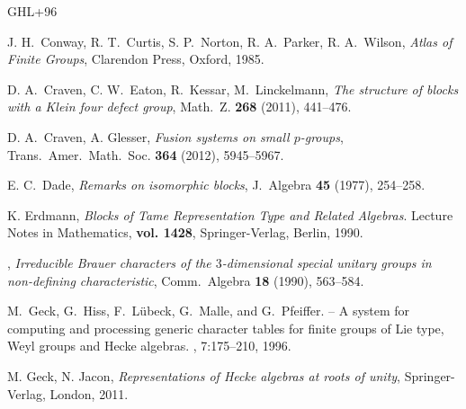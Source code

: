 \documentclass[12pt,a4paper]{amsart}
\theoremstyle{plain}\newtheorem{Theorem}{Theorem}[section]
\theoremstyle{plain}\newtheorem{Conjecture}[Theorem]{Conjecture}
\theoremstyle{plain}\newtheorem{Corollary}[Theorem]{Corollary}
\theoremstyle{plain}\newtheorem{Lemma}[Theorem]{Lemma}
\theoremstyle{plain}\newtheorem{Proposition}[Theorem]{Proposition}
\theoremstyle{definition}\newtheorem{Definition}[Theorem]{Definition}
\theoremstyle{definition}\newtheorem{Example}[Theorem]{Example}
\theoremstyle{definition}\newtheorem{Examples}[Theorem]{Examples}
\theoremstyle{definition}\newtheorem{Remark}[Theorem]{Remark}
\theoremstyle{definition}\newtheorem{Question}[Theorem]{Question}
\theoremstyle{definition}\newtheorem{Notation}[Theorem]{Notation}
\theoremstyle{definition}\newtheorem{Hypothesis}[Theorem]{Hypothesis}
\theoremstyle{definition}\newtheorem{Assumption}[Theorem]{Assumption}
\theoremstyle{definition}\newtheorem{Strategy}[Theorem]{Strategy}
\theoremstyle{definition}\newtheorem{Contents}[Theorem]{Contents}
\theoremstyle{definition}\newtheorem{Computations}[Theorem]{Computations}
\theoremstyle{definition}\newtheorem{Equivalences}[Theorem]{Equivalences}
\theoremstyle{definition}\newtheorem{Notation/Definition}[Theorem]{Notation/Definition}
\theoremstyle{definition}\newtheorem{noth}[Theorem]{}
\theoremstyle{plain}\newtheorem{Step}[Theorem]{Step}
\begin{document}
\begin{thebibliography}{GHL+96}

 {\sc J. H.~Conway, R. T.~Curtis, S. P.~Norton, R. A.~Parker, R. A.~Wilson}, 
\emph{Atlas of Finite Groups},
Clarendon Press, Oxford, 1985. 




 
 {\sc D. A.~Craven, C. W.~Eaton, R.~Kessar, M.~Linckelmann},
\emph{The structure of
blocks with a Klein four defect group}, Math.~Z. \textbf{268} (2011), 441--476.

 {\sc D. A.~Craven, A. Glesser}, 
\emph{Fusion systems on small $p$-groups},
Trans.~Amer.~Math.~Soc. \textbf{364}
(2012), 5945--5967. 

 {\sc E. C.~Dade}, 
\emph{Remarks on isomorphic blocks}, J.~Algebra
\textbf{45} (1977), 254--258. 


 {\sc K. Erdmann}, 
\emph{Blocks of Tame Representation Type and Related Algebras}. 
Lecture Notes in Mathematics,
\textbf{vol. 1428}, Springer-Verlag, Berlin, 1990. 





,
\emph{Irreducible Brauer characters of the $3$-dimensional special unitary
groups in non-defining characteristic},
Comm.~Algebra \textbf{18} (1990), 563--584.



M.~Geck, G.~Hiss, F.~L{\"u}beck, G.~Malle, and G.~Pfeiffer.
 -- {A} system for computing and processing generic
  character tables for finite groups of {L}ie type, {W}eyl groups and {H}ecke
  algebras.
, 7:175--210, 1996.


{\sc M. Geck, N. Jacon},
\emph{Representations of Hecke algebras at roots of unity},
Springer-Verlag, London, 2011.




\end{thebibliography}
\end{document}
